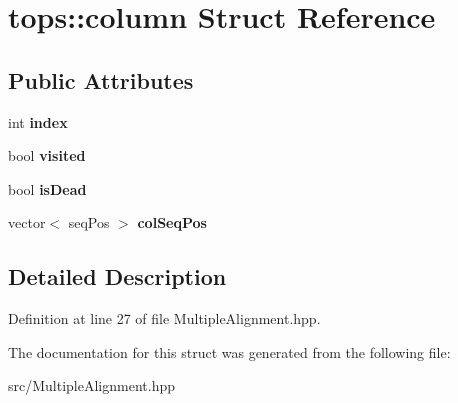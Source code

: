 \hypertarget{structtops_1_1column}{}\section{tops\+:\+:column Struct Reference}
\label{structtops_1_1column}
\subsection*{Public Attributes}
\begin{DoxyCompactItemize}
\item 
\mbox{\label{structtops_1_1column_aa6801c7b9432897cff4d48351c0d73f3}} 
int {\bfseries index}
\item 
\mbox{\label{structtops_1_1column_a8a72f7e3662ead6cb59ec8350c3ee739}} 
bool {\bfseries visited}
\item 
\mbox{\label{structtops_1_1column_af8959eab97e757afaf9e1942f2d93ae6}} 
bool {\bfseries is\+Dead}
\item 
\mbox{\label{structtops_1_1column_af442f0129b61e6bfeac37984fba0e100}} 
vector$<$ seq\+Pos $>$ {\bfseries col\+Seq\+Pos}
\end{DoxyCompactItemize}


\subsection{Detailed Description}


Definition at line 27 of file Multiple\+Alignment.\+hpp.



The documentation for this struct was generated from the following file\+:\begin{DoxyCompactItemize}
\item 
src/Multiple\+Alignment.\+hpp\end{DoxyCompactItemize}
